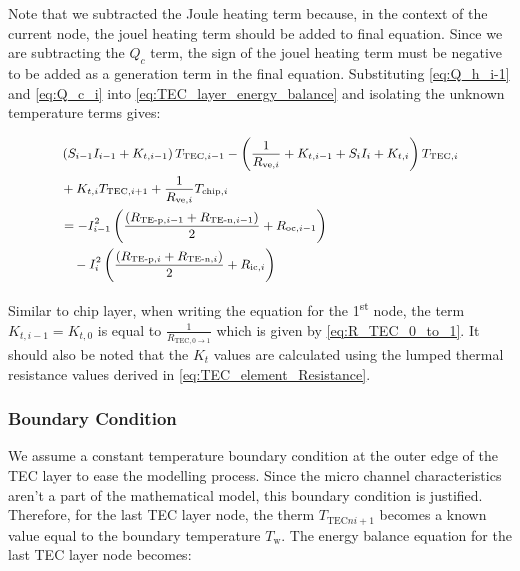 \documentclass[10pt,a4paper,twocolumn]{article}
\begin{document}
Note that we subtracted the Joule heating term because, in the context of the current node, the jouel heating term should be added to final equation. Since we are subtracting the $Q_c$ term, the sign of the jouel heating term must be negative to be added as a generation term in the final equation.
Substituting \cref{eq:Q_h_i-1} and \cref{eq:Q_c_i} into \cref{eq:TEC_layer_energy_balance} and isolating the unknown temperature terms gives:

\begin{equation}
  \small
  \begin{aligned}
     & \left(S_{i-1}I_{i-1}+K_{t,i-1}\right)T_{\text{TEC},i-1}-\left(\frac{1}{R_{\text{ve},i}}+K_{t,i-1}+S_{i}I_{i}+K_{t,i} \right)T_{\text{TEC},i} \\ &+K_{t,i}T_{\text{TEC},i+1}
    +\frac{1}{R_{\text{ve},i}}T_{\text{chip},i}                                                                                                     \\ &=-I_{i-1}^2 \left( \frac{(R_{\text{TE-p},i-1}+R_{\text{TE-n},i-1})}{2} + R_{\text{oc},i-1} \right) \\
     & \quad - I_{i}^2 \left( \frac{(R_{\text{TE-p},i}+R_{\text{TE-n},i})}{2} + R_{\text{ic},i} \right)
  \end{aligned}
\end{equation}

Similar to chip layer, when writing the equation for the 1\textsuperscript{st} node, the term $K_{t,i-1} = K_{t,0}$ is equal to $\frac{1}{R_{\text{TEC}, 0\to 1}}$ which is given by \cref{eq:R_TEC_0_to_1}. It should also be noted that the $K_{t}$ values are calculated using the lumped thermal resistance values derived in \cref{eq:TEC_element_Resistance}.

\subsubsection{Boundary Condition}

We assume a constant temperature boundary condition at the outer edge of the TEC layer to ease the modelling process. Since the micro channel characteristics aren't a part of the mathematical model, this boundary condition is justified. Therefore, for the last TEC layer node, the therm $T_{\text{TEC}ni+1}$ becomes a known value equal to the boundary temperature $T_{\text{w}}$. The energy balance equation for the last TEC layer node becomes:
\end{document}
